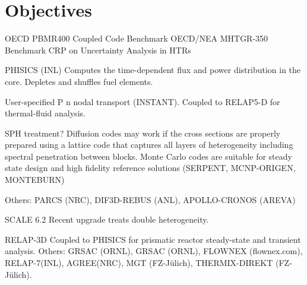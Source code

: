 \documentclass[11pt,letterpaper]{article}
\begin{document}
\section{Objectives}



OECD PBMR400 Coupled Code Benchmark %
OECD/NEA MHTGR-350 Benchmark %
CRP on Uncertainty Analysis in HTRs %
\cite{gougar_htgr_2016}

PHISICS (INL) %
Computes the time-dependent flux and power distribution in the core.
Depletes and shuffles fuel elements.

User-specified P n nodal transport (INSTANT). Coupled to
RELAP5-D for thermal-fluid analysis.

SPH treatment?
Diffusion codes may work if the cross sections are properly prepared using a lattice code that captures all layers of heterogeneity including spectral penetration between blocks. Monte Carlo codes are suitable for steady state design and high fidelity reference solutions (SERPENT, MCNP-ORIGEN, MONTEBURN)

Others: PARCS (NRC), DIF3D-REBUS (ANL), APOLLO-CRONOS (AREVA)
\cite{gougar_htgr_2016}

SCALE 6.2
Recent upgrade treats double heterogeneity.
\cite{gougar_htgr_2016}

RELAP-3D
Coupled to PHISICS for prismatic reactor steady-state and transient analysis.
Others: GRSAC (ORNL), GRSAC (ORNL), FLOWNEX (flownex.com), RELAP-7(INL), AGREE(NRC), MGT (FZ-Jülich),
THERMIX-DIREKT (FZ-Jülich).

\cite{gougar_htgr_2016}

\pagebreak


\end{document}
